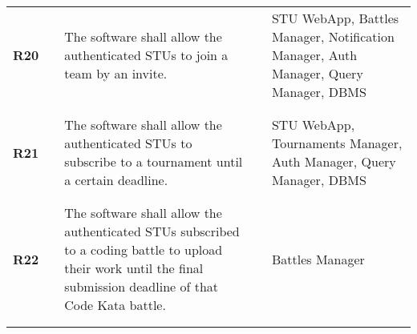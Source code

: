 \begin{longtable}[H]{l l p{6cm} l p{4cm}}
    \textbf{R20}            & \vline & The software shall allow the authenticated STUs to join a team by an invite.                                                                                                                                                                                                 & \vline &  STU WebApp, Battles Manager, Notification Manager, Auth Manager, Query Manager, DBMS    \\          
                            &        &                                                                                                                                                                                                                                                                              &        &                                                                                          \\\hline & & \\ 
    \textbf{R21}            & \vline & The software shall allow the authenticated STUs to subscribe to a tournament until a certain deadline.                                                                                                                                                                       & \vline &  STU WebApp, Tournaments Manager, Auth Manager, Query Manager, DBMS                      \\          
                            &        &                                                                                                                                                                                                                                                                              &        &                                                                                          \\\hline & & \\ 
    \textbf{R22}            & \vline & The software shall allow the authenticated STUs subscribed to a coding battle to upload their work until the final submission deadline of that Code Kata battle.                                                                                                             & \vline &  Battles Manager                                                                         \\          
                            &        &                                                                                                                                                                                                                                                                              &        &                                                                                          \\\hline & & \\ 

\end{longtable}
